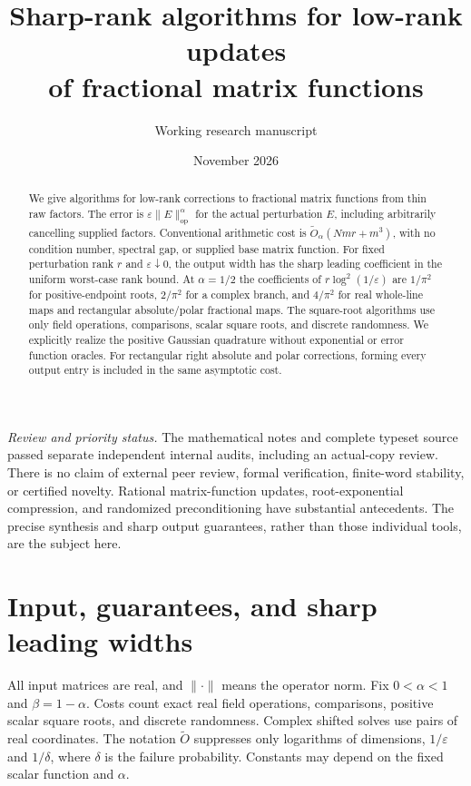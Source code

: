 \documentclass[11pt]{article}
\title{Sharp-rank algorithms for low-rank updates\texorpdfstring{\\}{ }of fractional matrix functions}
\author{Working research manuscript}
\date{November 2026}
\numberwithin{equation}{section}
\newcommand{\op}{\mathrm{op}}
\begin{document}
\maketitle

\begin{abstract}
We give algorithms for low-rank corrections to fractional matrix
functions from thin raw factors. The error is
$\varepsilon\|E\|_{\op}^{\alpha}$ for the actual perturbation $E$,
including arbitrarily cancelling supplied factors. Conventional arithmetic
cost is $\widetilde O_\alpha(Nmr+m^3)$, with no condition number,
spectral gap, or supplied base matrix function. For fixed perturbation
rank $r$ and $\varepsilon\downarrow0$, the output width has the sharp
leading coefficient in the uniform worst-case rank bound. At
$\alpha=1/2$ the coefficients of $r\log^2(1/\varepsilon)$ are
$1/\pi^2$ for positive-endpoint roots, $2/\pi^2$ for a complex branch,
and $4/\pi^2$ for real whole-line maps and rectangular absolute/polar
fractional maps. The square-root algorithms use only field operations,
comparisons, scalar square roots, and discrete randomness. We explicitly
realize the positive Gaussian quadrature without exponential or error
function oracles. For rectangular right absolute and polar corrections,
forming every output entry is included in the same asymptotic cost.
\end{abstract}

\noindent\textit{Review and priority status.}
The mathematical notes and complete typeset source passed separate
independent internal audits, including an actual-copy review. There is
no claim of external peer review, formal verification, finite-word
stability, or certified novelty. Rational matrix-function updates,
root-exponential compression, and randomized preconditioning have
substantial antecedents. The precise synthesis and sharp output
guarantees, rather than those individual tools, are the subject here.

\section{Input, guarantees, and sharp leading widths}

All input matrices are real, and $\|\cdot\|$ means the operator norm.
Fix $0<\alpha<1$ and $\beta=1-\alpha$. Costs count exact real field
operations, comparisons, positive scalar square roots, and discrete
randomness. Complex shifted solves use pairs of real coordinates.
The notation $\widetilde O$ suppresses only logarithms of dimensions,
$1/\varepsilon$ and $1/\delta$, where $\delta$ is the failure probability.
Constants may depend on the fixed scalar function and $\alpha$.
\end{document}
